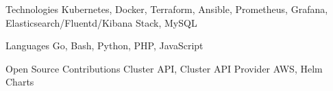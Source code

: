 


\begin{cvskills}


\cvskill
{Technologies} %
{Kubernetes, Docker, Terraform, Ansible, Prometheus, Grafana, Elasticsearch/Fluentd/Kibana Stack, MySQL} %


\cvskill
{Languages} %
{Go, Bash, Python, PHP, JavaScript}


\cvskill
{Open Source Contributions} %
{Cluster API, Cluster API Provider AWS, Helm Charts}


\end{cvskills}
